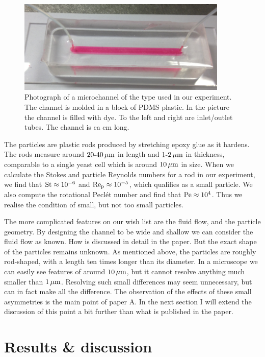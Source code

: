 \documentclass[thesis.tex]{subfiles}
\begin{document}
\begin{figure}
\includegraphics[width=10cm]{figs/expsetup_lores.png}%
\caption{\label{fig:exp_setup} Photograph of a microchannel of the type used in our experiment. The channel is molded in a block of PDMS plastic. In the picture the channel is filled with dye. To the left and right are inlet/outlet tubes. The channel is ca \unit[5]{cm} long.}%
\end{figure}

The particles are plastic rods produced by stretching epoxy glue as it hardens. The rods measure around $\unit[20\textrm{-}40]{\mu m}$ in length and $\unit[1\textrm{-}2]{\mu m}$ in thickness, comparable to a single yeast cell which is around $\unit[10]{\mu m}$ in size. When we calculate the Stokes and particle Reynolds numbers for a rod in our experiment, we find that $\mbox{St} \approx 10^{-6}$ and $\mbox{Re}_{\mathrm p} \approx 10^{-5}$, which qualifies as a small particle. We also compute the rotational Pecl\'et number and find that $\mbox{Pe}\approx10^{4}$. Thus we realise the condition of small, but not too small particles. 

The more complicated features on our wish list are the fluid flow, and the particle geometry. By designing the channel to be wide and shallow we can consider the fluid flow as known. How is discussed in detail in the paper. But the exact shape of the particles remains unknown. As mentioned above, the particles are roughly rod-shaped, with a length ten times longer than its diameter. In a microscope we can easily see features of around $\unit[10]{\mu m}$, but it cannot resolve anything much smaller than $\unit[1]{\mu m}$. Resolving such small differences may seem unnecessary, but can in fact make all the difference. The observation of the effects of these small asymmetries is the main point of paper A. In the next section I will extend the discussion of this point a bit further than what is published in the paper.

\section{Results \& discussion}
\end{document}
